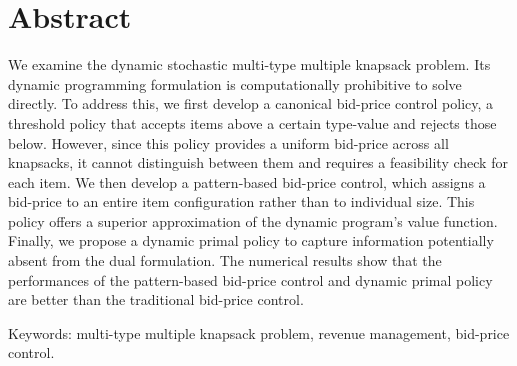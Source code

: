 
\section*{Abstract}
We examine the dynamic stochastic multi-type multiple knapsack problem. Its dynamic programming formulation is computationally prohibitive to solve directly. To address this, we first develop a canonical bid-price control policy, a threshold policy that accepts items above a certain type-value and rejects those below. However, since this policy provides a uniform bid-price across all knapsacks, it cannot distinguish between them and requires a feasibility check for each item. We then develop a pattern-based bid-price control, which assigns a bid-price to an entire item configuration rather than to individual size. This policy offers a superior approximation of the dynamic program's value function. Finally, we propose a dynamic primal policy to capture information potentially absent from the dual formulation. The numerical results show that the performances of the pattern-based bid-price control and dynamic primal policy are better than the traditional bid-price control.





Keywords: multi-type multiple knapsack problem, revenue management, bid-price control.




